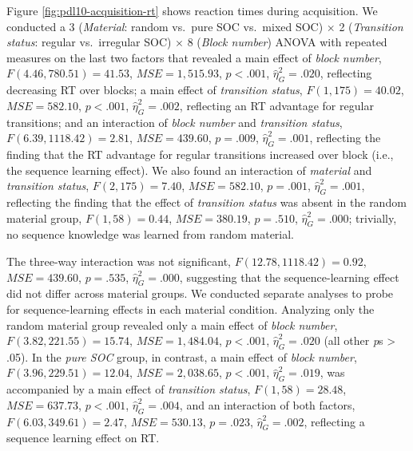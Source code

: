 \documentclass[man]{apa6}
\theoremstyle{definition}
\theoremstyle{definition}
\theoremstyle{definition}
\theoremstyle{remark}
\begin{document}
Figure \ref{fig:pdl10-acquisition-rt} shows reaction times during
acquisition. We conducted a 3 (\emph{Material}: random vs.~pure SOC
vs.~mixed SOC) \(\times\) 2 (\emph{Transition status}: regular
vs.~irregular SOC) \(\times\) 8 (\emph{Block number}) ANOVA with
repeated measures on the last two factors that revealed a main effect of
\emph{block number}, \(F(4.46, 780.51) = 41.53\),
\(\mathit{MSE} = 1,515.93\), \(p < .001\), \(\hat{\eta}^2_G = .020\),
reflecting decreasing RT over blocks; a main effect of \emph{transition
status}, \(F(1, 175) = 40.02\), \(\mathit{MSE} = 582.10\), \(p < .001\),
\(\hat{\eta}^2_G = .002\), reflecting an RT advantage for regular
transitions; and an interaction of \emph{block number} and
\emph{transition status}, \(F(6.39, 1118.42) = 2.81\),
\(\mathit{MSE} = 439.60\), \(p = .009\), \(\hat{\eta}^2_G = .001\),
reflecting the finding that the RT advantage for regular transitions
increased over block (i.e., the sequence learning effect). We also found
an interaction of \emph{material} and \emph{transition status},
\(F(2, 175) = 7.40\), \(\mathit{MSE} = 582.10\), \(p = .001\),
\(\hat{\eta}^2_G = .001\), reflecting the finding that the effect of
\emph{transition status} was absent in the random material group,
\(F(1, 58) = 0.44\), \(\mathit{MSE} = 380.19\), \(p = .510\),
\(\hat{\eta}^2_G = .000\); trivially, no sequence knowledge was learned
from random material.

The three-way interaction was not significant,
\(F(12.78, 1118.42) = 0.92\), \(\mathit{MSE} = 439.60\), \(p = .535\),
\(\hat{\eta}^2_G = .000\), suggesting that the sequence-learning effect
did not differ across material groups. We conducted separate analyses to
probe for sequence-learning effects in each material condition.
Analyzing only the random material group revealed only a main effect of
\emph{block number}, \(F(3.82, 221.55) = 15.74\),
\(\mathit{MSE} = 1,484.04\), \(p < .001\), \(\hat{\eta}^2_G = .020\)
(all other \emph{p}s \textgreater{} .05). In the \emph{pure SOC} group,
in contrast, a main effect of \emph{block number},
\(F(3.96, 229.51) = 12.04\), \(\mathit{MSE} = 2,038.65\), \(p < .001\),
\(\hat{\eta}^2_G = .019\), was accompanied by a main effect of
\emph{transition status}, \(F(1, 58) = 28.48\),
\(\mathit{MSE} = 637.73\), \(p < .001\), \(\hat{\eta}^2_G = .004\), and
an interaction of both factors, \(F(6.03, 349.61) = 2.47\),
\(\mathit{MSE} = 530.13\), \(p = .023\), \(\hat{\eta}^2_G = .002\),
reflecting a sequence learning effect on RT.
\end{document}

